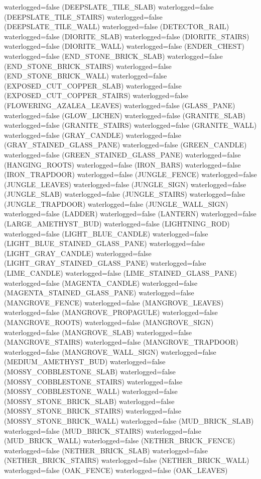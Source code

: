 \documentclass[11pt]{article}
\begin{document}
waterlogged=false (DEEPSLATE_TILE_SLAB)
waterlogged=false (DEEPSLATE_TILE_STAIRS)
waterlogged=false (DEEPSLATE_TILE_WALL)
waterlogged=false (DETECTOR_RAIL)
waterlogged=false (DIORITE_SLAB)
waterlogged=false (DIORITE_STAIRS)
waterlogged=false (DIORITE_WALL)
waterlogged=false (ENDER_CHEST)
waterlogged=false (END_STONE_BRICK_SLAB)
waterlogged=false (END_STONE_BRICK_STAIRS)
waterlogged=false (END_STONE_BRICK_WALL)
waterlogged=false (EXPOSED_CUT_COPPER_SLAB)
waterlogged=false (EXPOSED_CUT_COPPER_STAIRS)
waterlogged=false (FLOWERING_AZALEA_LEAVES)
waterlogged=false (GLASS_PANE)
waterlogged=false (GLOW_LICHEN)
waterlogged=false (GRANITE_SLAB)
waterlogged=false (GRANITE_STAIRS)
waterlogged=false (GRANITE_WALL)
waterlogged=false (GRAY_CANDLE)
waterlogged=false (GRAY_STAINED_GLASS_PANE)
waterlogged=false (GREEN_CANDLE)
waterlogged=false (GREEN_STAINED_GLASS_PANE)
waterlogged=false (HANGING_ROOTS)
waterlogged=false (IRON_BARS)
waterlogged=false (IRON_TRAPDOOR)
waterlogged=false (JUNGLE_FENCE)
waterlogged=false (JUNGLE_LEAVES)
waterlogged=false (JUNGLE_SIGN)
waterlogged=false (JUNGLE_SLAB)
waterlogged=false (JUNGLE_STAIRS)
waterlogged=false (JUNGLE_TRAPDOOR)
waterlogged=false (JUNGLE_WALL_SIGN)
waterlogged=false (LADDER)
waterlogged=false (LANTERN)
waterlogged=false (LARGE_AMETHYST_BUD)
waterlogged=false (LIGHTNING_ROD)
waterlogged=false (LIGHT_BLUE_CANDLE)
waterlogged=false (LIGHT_BLUE_STAINED_GLASS_PANE)
waterlogged=false (LIGHT_GRAY_CANDLE)
waterlogged=false (LIGHT_GRAY_STAINED_GLASS_PANE)
waterlogged=false (LIME_CANDLE)
waterlogged=false (LIME_STAINED_GLASS_PANE)
waterlogged=false (MAGENTA_CANDLE)
waterlogged=false (MAGENTA_STAINED_GLASS_PANE)
waterlogged=false (MANGROVE_FENCE)
waterlogged=false (MANGROVE_LEAVES)
waterlogged=false (MANGROVE_PROPAGULE)
waterlogged=false (MANGROVE_ROOTS)
waterlogged=false (MANGROVE_SIGN)
waterlogged=false (MANGROVE_SLAB)
waterlogged=false (MANGROVE_STAIRS)
waterlogged=false (MANGROVE_TRAPDOOR)
waterlogged=false (MANGROVE_WALL_SIGN)
waterlogged=false (MEDIUM_AMETHYST_BUD)
waterlogged=false (MOSSY_COBBLESTONE_SLAB)
waterlogged=false (MOSSY_COBBLESTONE_STAIRS)
waterlogged=false (MOSSY_COBBLESTONE_WALL)
waterlogged=false (MOSSY_STONE_BRICK_SLAB)
waterlogged=false (MOSSY_STONE_BRICK_STAIRS)
waterlogged=false (MOSSY_STONE_BRICK_WALL)
waterlogged=false (MUD_BRICK_SLAB)
waterlogged=false (MUD_BRICK_STAIRS)
waterlogged=false (MUD_BRICK_WALL)
waterlogged=false (NETHER_BRICK_FENCE)
waterlogged=false (NETHER_BRICK_SLAB)
waterlogged=false (NETHER_BRICK_STAIRS)
waterlogged=false (NETHER_BRICK_WALL)
waterlogged=false (OAK_FENCE)
waterlogged=false (OAK_LEAVES)
\end{document}

